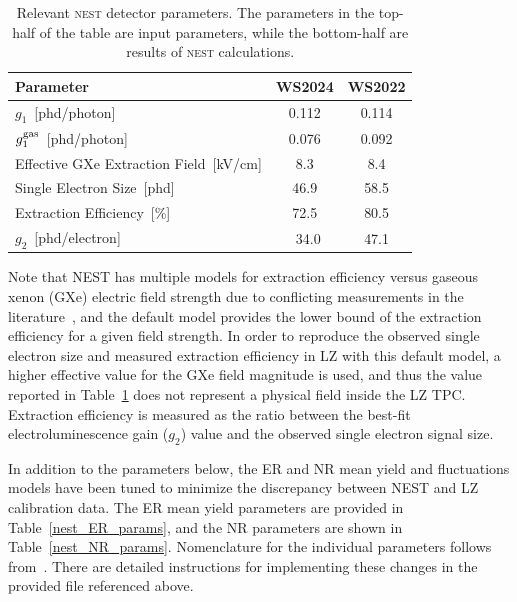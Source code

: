 \begin{table}[h!]
    \centering
    \caption{Relevant \textsc{nest} detector parameters. The parameters in the top-half of the table are input parameters, while the bottom-half are results of \textsc{nest} calculations.\\}
    \begin{tabular}{l c c}
    \hline
    \hline
    Parameter & WS2024 & WS2022 \\ \hline
    $g_1$~[phd/photon]  &  0.112 & 0.114 \\
    $g_1^{\rm gas}$~[phd/photon] & 0.076 & 0.092 \\
    Effective GXe Extraction Field~[kV/cm] & 8.3 & 8.4 \\
    \hline
    Single Electron Size~[phd] & 46.9 & 58.5 \\
    Extraction Efficiency~[\%] & 72.5 & 80.5 \\
        $g_2$~[phd/electron] &~34.0 & 47.1 \\
    \hline
    \hline
    \end{tabular}
    \label{nest_det_params}
\end{table}

Note that NEST has multiple models for extraction efficiency versus gaseous xenon (GXe) electric field strength due to conflicting measurements in the literature~\cite{Xu:2019dqb}, and the default model provides the lower bound of the extraction efficiency for a given field strength. In order to reproduce the observed single electron size and measured extraction efficiency in LZ with this default model, a higher effective value for the GXe field magnitude is used, and thus the value reported in Table~\ref{nest_det_params} does not represent a physical field inside the LZ TPC. Extraction efficiency is measured as the ratio between the best-fit electroluminescence gain ($g_2$) value and the observed single electron signal size. 

In addition to the parameters below, the ER and NR mean yield and fluctuations models have been tuned to minimize the discrepancy between NEST and LZ calibration data. The ER mean yield parameters are provided in Table~\ref{nest_ER_params}, and the NR parameters are shown in Table~\ref{nest_NR_params}. Nomenclature for the individual parameters follows from~\cite{szydagis2022review}. There are detailed instructions for implementing these changes in the provided file referenced above.

